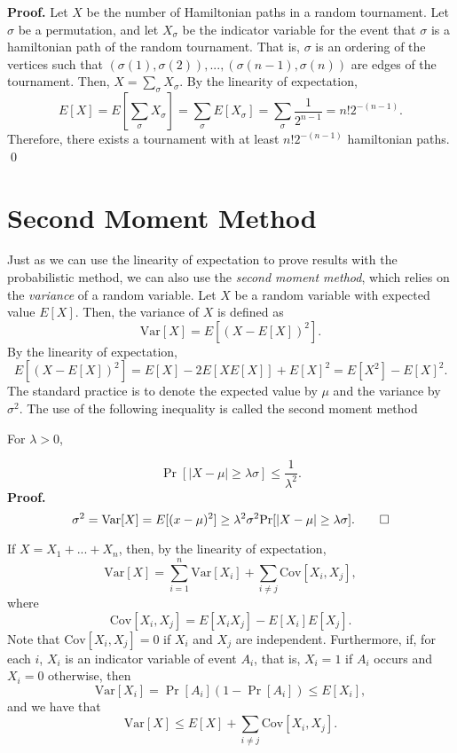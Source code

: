 \textbf{Proof. } Let $X$ be the number of Hamiltonian paths in a random tournament. Let $\sigma$ be a permutation, and let $X_\sigma$ be the indicator variable for the event that $\sigma$ is a hamiltonian path of the random tournament. That is, $\sigma$ is an ordering of the vertices such that $(\sigma(1), \sigma(2)), ..., (\sigma(n - 1), \sigma(n))$ are edges of the tournament. Then, $X = \sum_{\sigma} X_\sigma$. By the linearity of expectation,
\[E[X] = E\left[\sum_{\sigma} X_\sigma\right] = \sum_{\sigma} E[X_\sigma] = \sum_{\sigma} \frac{1}{2^{n - 1}} = n!2^{-(n - 1)}.\]
Therefore, there exists a tournament with at least $n!2^{-(n - 1)}$ hamiltonian paths. \qed

\section{Second Moment Method}\label{sec:probmet:secondmoment}

Just as we can use the linearity of expectation to prove results with the probabilistic method, we can also use the \textit{second moment method}, which relies on the \textit{variance} of a random variable. Let $X$ be a random variable with expected value $E[X]$. Then, the variance of $X$ is defined as
\[\text{Var}[X] = E[(X - E[X])^2].\]
By the linearity of expectation, 
\[E[(X - E[X])^2] = E[X] - 2E[XE[X]] + E[X]^2 = E[X^2] - E[X]^2.\]
The standard practice is to denote the expected value by $\mu$ and the variance by $\sigma^2$. The use of the following inequality is called the second moment method \par

\begin{theorem}\label{thm:probmet:chebyschev}\cite{alon2016probabilistic}
    For $\lambda > 0$,
\end{theorem}
\[\Pr[|X - \mu| \geq \lambda \sigma] \leq \frac{1}{\lambda^2}.\]
\textbf{Proof. } 
\[\sigma^2 = \text{Var}[X] = E[(x - \mu)^2] \geq \lambda^2\sigma^2 \Pr[|X - \mu| \geq \lambda \sigma]. \qed\]

If $X = X_1 + ... + X_n$, then, by the linearity of expectation,
\[\text{Var}[X] = \sum_{i = 1}^{n}\text{Var}[X_i] + \sum_{i \neq j}\text{Cov}[X_i, X_j],\]
where 
\[\text{Cov}[X_i, X_j] = E[X_iX_j] - E[X_i]E[X_j].\] 
Note that $\text{Cov}[X_i, X_j] = 0$ if $X_i$ and $X_j$ are independent. Furthermore, if, for each $i$, $X_i$ is an indicator variable of event $A_i$, that is, $X_i = 1$ if $A_i$ occurs and $X_i = 0$ otherwise, then
\[\text{Var}[X_i] = \Pr[A_i](1 - \Pr[A_i]) \leq E[X_i],\]
and we have that
\begin{equation}
    \text{Var}[X] \leq E[X] + \sum_{i \neq j} \text{Cov}[X_i, X_j].
\end{equation}

